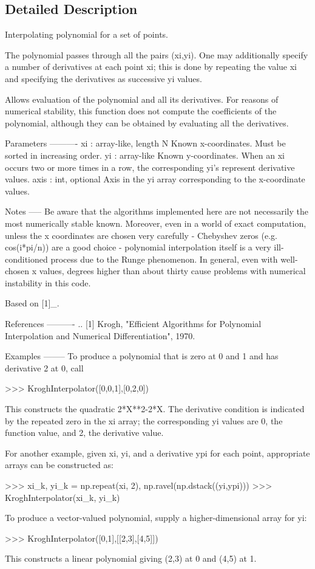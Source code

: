 \subsection{Detailed Description}
\begin{DoxyVerb}Interpolating polynomial for a set of points.

The polynomial passes through all the pairs (xi,yi). One may
additionally specify a number of derivatives at each point xi;
this is done by repeating the value xi and specifying the
derivatives as successive yi values.

Allows evaluation of the polynomial and all its derivatives.
For reasons of numerical stability, this function does not compute
the coefficients of the polynomial, although they can be obtained
by evaluating all the derivatives.

Parameters
----------
xi : array-like, length N
    Known x-coordinates. Must be sorted in increasing order.
yi : array-like
    Known y-coordinates. When an xi occurs two or more times in
    a row, the corresponding yi's represent derivative values.
axis : int, optional
    Axis in the yi array corresponding to the x-coordinate values.

Notes
-----
Be aware that the algorithms implemented here are not necessarily
the most numerically stable known. Moreover, even in a world of
exact computation, unless the x coordinates are chosen very
carefully - Chebyshev zeros (e.g. cos(i*pi/n)) are a good choice -
polynomial interpolation itself is a very ill-conditioned process
due to the Runge phenomenon. In general, even with well-chosen
x values, degrees higher than about thirty cause problems with
numerical instability in this code.

Based on [1]_.

References
----------
.. [1] Krogh, "Efficient Algorithms for Polynomial Interpolation
    and Numerical Differentiation", 1970.

Examples
--------
To produce a polynomial that is zero at 0 and 1 and has
derivative 2 at 0, call

>>> KroghInterpolator([0,0,1],[0,2,0])

This constructs the quadratic 2*X**2-2*X. The derivative condition
is indicated by the repeated zero in the xi array; the corresponding
yi values are 0, the function value, and 2, the derivative value.

For another example, given xi, yi, and a derivative ypi for each
point, appropriate arrays can be constructed as:

>>> xi_k, yi_k = np.repeat(xi, 2), np.ravel(np.dstack((yi,ypi)))
>>> KroghInterpolator(xi_k, yi_k)

To produce a vector-valued polynomial, supply a higher-dimensional
array for yi:

>>> KroghInterpolator([0,1],[[2,3],[4,5]])

This constructs a linear polynomial giving (2,3) at 0 and (4,5) at 1.\end{DoxyVerb}
 

